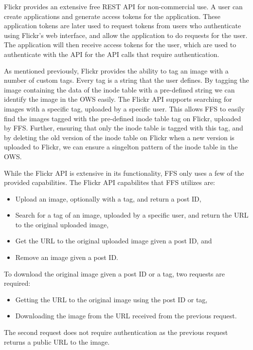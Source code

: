 Flickr provides an extensive free REST API for non-commercial use. A user can create applications and generate access tokens for the application. These application tokens are later used to request tokens from users who authenticate using Flickr's web interface, and allow the application to do requests for the user. The application will then receive access tokens for the user, which are used to authenticate with the API for the API calls that require authentication.

As mentioned previously, Flickr provides the ability to tag an image with a number of custom tags. Every tag is a string that the user defines. By tagging the image containing the data of the inode table with a pre-defined string we can identify the image in the OWS easily. The Flickr API supports searching for images with a specific tag, uploaded by a specific user. This allows FFS to easily find the images tagged with the pre-defined inode table tag on Flickr, uploaded by FFS. Further, ensuring that only the inode table is tagged with this tag, and by deleting the old version of the inode table on Flickr when a new version is uploaded to Flickr, we can ensure a singelton pattern of the inode table in the OWS. 

While the Flickr API is extensive in its functionality, FFS only uses a few of the provided capabilities. The Flickr API capabilites that FFS utilizes are:
\begin{itemize}
	\item Upload an image, optionally with a tag, and return a post ID,
	\item Search for a tag of an image, uploaded by a specific user, and return the URL to the original uploaded image,
	\item Get the URL to the original uploaded image given a post ID, and
	\item Remove an image given a post ID.
\end{itemize}

To download the original image given a post ID or a tag, two requests are required:
\begin{itemize}
	\item Getting the URL to the original image using the post ID or tag,
	\item Downloading the image from the URL received from the previous request.
\end{itemize}
The second request does not require authentication as the previous request returns a public URL to the image. 

